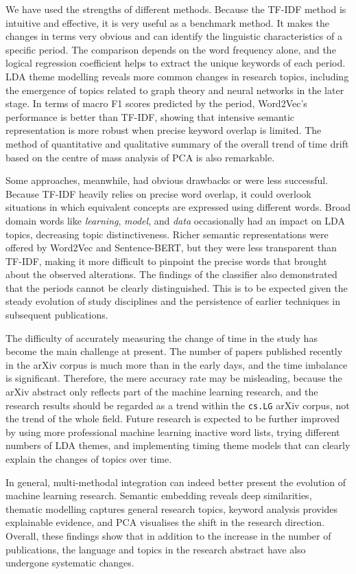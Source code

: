 \documentclass[11pt]{article}
\begin{document}
We have used the strengths of different methods. Because the TF-IDF method is intuitive and effective, it is very useful as a benchmark method. It makes the changes in terms very obvious and can identify the linguistic characteristics of a specific period. The comparison depends on the word frequency alone, and the logical regression coefficient helps to extract the unique keywords of each period. LDA theme modelling reveals more common changes in research topics, including the emergence of topics related to graph theory and neural networks in the later stage. In terms of macro F1 scores predicted by the period, Word2Vec's performance is better than TF-IDF, showing that intensive semantic representation is more robust when precise keyword overlap is limited. The method of quantitative and qualitative summary of the overall trend of time drift based on the centre of mass analysis of PCA is also remarkable.

Some approaches, meanwhile, had obvious drawbacks or were less successful. Because TF-IDF heavily relies on precise word overlap, it could overlook situations in which equivalent concepts are expressed using different words. Broad domain words like \textit{learning}, \textit{model}, and \textit{data} occasionally had an impact on LDA topics, decreasing topic distinctiveness. Richer semantic representations were offered by Word2Vec and Sentence-BERT, but they were less transparent than TF-IDF, making it more difficult to pinpoint the precise words that brought about the observed alterations. The findings of the classifier also demonstrated that the periods cannot be clearly distinguished. This is to be expected given the steady evolution of study disciplines and the persistence of earlier techniques in subsequent publications.

The difficulty of accurately measuring the change of time in the study has become the main challenge at present. The number of papers published recently in the arXiv corpus is much more than in the early days, and the time imbalance is significant. Therefore, the mere accuracy rate may be misleading, because the arXiv abstract only reflects part of the machine learning research, and the research results should be regarded as a trend within the \texttt{cs.LG} arXiv corpus, not the trend of the whole field. Future research is expected to be further improved by using more professional machine learning inactive word lists, trying different numbers of LDA themes, and implementing timing theme models that can clearly explain the changes of topics over time.

In general, multi-methodal integration can indeed better present the evolution of machine learning research. Semantic embedding reveals deep similarities, thematic modelling captures general research topics, keyword analysis provides explainable evidence, and PCA visualises the shift in the research direction. Overall, these findings show that in addition to the increase in the number of publications, the language and topics in the research abstract have also undergone systematic changes.




\end{document}
